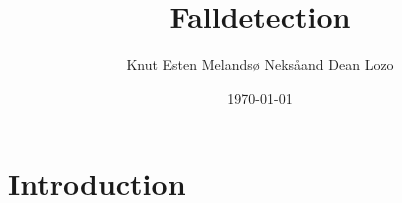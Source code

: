 \documentclass[11pt,twoside,a4paper]{report}
\begin{document}
\title{Falldetection}
\author{Knut Esten Melandsø Neks\aa and Dean Lozo}
\date{\today}
\maketitle

\begin{abstract}

\end{abstract}

\tableofcontents

\chapter{Introduction}
\end{document}
